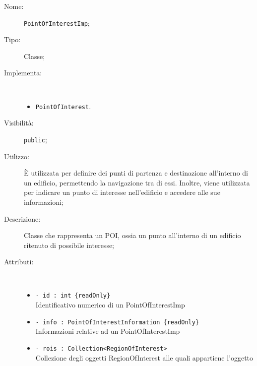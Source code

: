 \documentclass[../DefinizioneDiProdotto.tex]{subfiles}
\begin{document}
\begin{description}
	\item[Nome:] \texttt{PointOfInterestImp};
	\item[Tipo:] Classe;
	\item[Implementa:] \
	\begin{itemize}
		\item \texttt{PointOfInterest}.
		
	\end{itemize}
	\item[Visibilità:] \texttt{public};
	\item[Utilizzo:] È utilizzata per definire dei punti di partenza e destinazione all'interno di un edificio, permettendo la navigazione tra di essi. Inoltre, viene utilizzata per indicare un punto di interesse nell'edificio e accedere alle sue informazioni;
	\item[Descrizione:] Classe che rappresenta un POI, ossia un punto all'interno di un edificio ritenuto di possibile interesse;
	\item[Attributi:] \
	\begin{itemize}
		\item \texttt{- id : int \{readOnly\}}\\
		Identificativo numerico di un PointOfInterestImp
		
		\item \texttt{- info : PointOfInterestInformation \{readOnly\}}\\
		Informazioni relative ad un PointOfInterestImp
		
		\item \texttt{- rois : Collection<RegionOfInterest>}\\
		Collezione degli oggetti RegionOfInterest alle quali appartiene l'oggetto
		

\end{itemize}
\end{description}
\end{document}
